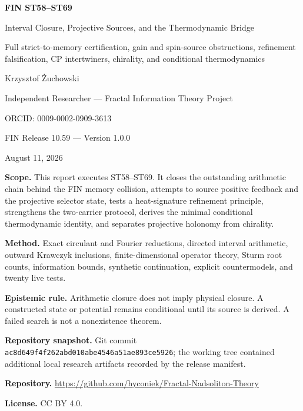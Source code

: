 \documentclass[11pt,a4paper]{article}
\begin{document}
\begin{titlepage}
\centering
\vspace*{1.25cm}
{\LARGE\bfseries FIN ST58--ST69\par}
\vspace{0.35cm}
{\Large Interval Closure, Projective Sources, and the Thermodynamic Bridge\par}
\vspace{0.40cm}
{\large Full strict-to-memory certification, gain and spin-source obstructions, refinement falsification, CP intertwiners, chirality, and conditional thermodynamics\par}
\vspace{1.05cm}
{\Large Krzysztof Żuchowski\par}
\vspace{0.24cm}
{\large Independent Researcher --- Fractal Information Theory Project\par}
{\large ORCID: 0009-0002-0909-3613\par}
\vspace{0.85cm}
{\large FIN Release 10.59 --- Version 1.0.0\par}
{\large August 11, 2026\par}
\vfill
\begin{minipage}{0.89\textwidth}
\textbf{Scope.} This report executes ST58--ST69. It closes the outstanding arithmetic chain behind the FIN memory collision, attempts to source positive feedback and the projective selector state, tests a heat-signature refinement principle, strengthens the two-carrier protocol, derives the minimal conditional thermodynamic identity, and separates projective holonomy from chirality.\par
\textbf{Method.} Exact circulant and Fourier reductions, directed interval arithmetic, outward Krawczyk inclusions, finite-dimensional operator theory, Sturm root counts, information bounds, synthetic continuation, explicit countermodels, and twenty live tests.\par
\textbf{Epistemic rule.} Arithmetic closure does not imply physical closure. A constructed state or potential remains conditional until its source is derived. A failed search is not a nonexistence theorem.\par
\textbf{Repository snapshot.} Git commit \texttt{ac8d649f4f262abd010abe4546a51ae893ce5926}; the working tree contained additional local research artifacts recorded by the release manifest.\par
\textbf{Repository.} \url{https://github.com/hyconiek/Fractal-Nadsoliton-Theory}\par
\textbf{License.} CC BY 4.0.
\end{minipage}
\end{titlepage}
\end{document}
